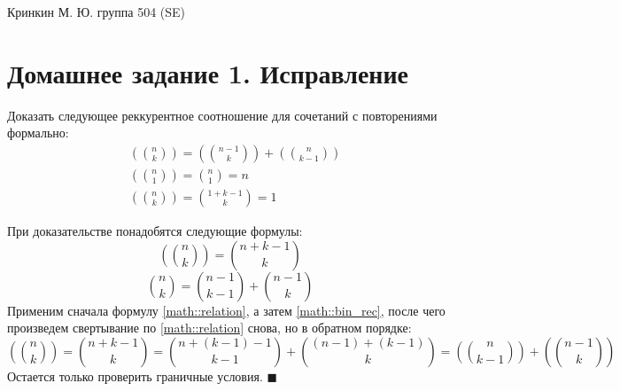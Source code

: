 \documentclass[a4paper,12pt]{article}
\begin{document}
\sloppy

\lstset{
	basicstyle=\small,
	stringstyle=\ttfamily,
	showstringspaces=false,
	columns=fixed,
	breaklines=true,
	numbers=right,
	numberstyle=\tiny
}

\newtheorem{Def}{Определение}[section]
\newtheorem{Th}{Теорема}
\newtheorem{Lem}[Th]{Лемма}
\newenvironment{Proof}
	{\par\noindent{\bf Доказательство.}}
	{\hfill$\scriptstyle\blacksquare$}
\newenvironment{Solution}
	{\par\noindent{\bf Решение.}}
	{\hfill$\scriptstyle\blacksquare$}


\begin{flushright}
	Кринкин М. Ю. группа 504 (SE)
\end{flushright}

\section{Домашнее задание 1. Исправление}
Доказать следующее реккурентное соотношение для сочетаний с повторениями формально:
\begin{equation}
	\begin{split}
		& \left( \binom{n}{k} \right) = \left( \binom{n-1}{k} \right) + \left( \binom{n}{k-1} \right) \\
		& \left( \binom{n}{1} \right) = \binom{n}{1} = n \\
		& \left( \binom{n}{k} \right) = \binom{1 + k - 1}{k} = 1
	\end{split}
\end{equation}

\begin{Proof}
При доказательстве понадобятся следующие формулы:
\begin{equation}
	\left( \binom{n}{k} \right) = \binom{n+k-1}{k}
	\label{math::relation}
\end{equation}
\begin{equation}
	\binom{n}{k} = \binom{n-1}{k-1} + \binom{n-1}{k}
	\label{math::bin_rec}
\end{equation}
Применим сначала формулу \ref{math::relation}, а затем \ref{math::bin_rec}, после чего произведем свертывание по \ref{math::relation} снова, но в обратном порядке:
\[
	\left( \binom{n}{k} \right) = \binom{n+k-1}{k} = \binom{n+\left(k-1\right)-1}{k-1} + \binom{\left(n-1\right) + \left(k-1\right)}{k} = \left(\binom{n}{k-1}\right) + \left(\binom{n-1}{k}\right)
\]
Остается только проверить граничные условия.
\end{Proof}
\end{document}
